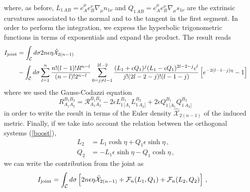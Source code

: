 \documentclass[11pt,letterpaper]{article}
\begin{document}
where, as before, $L_{1\, AB}=e_{A}^{\mu}e_{B}^{\nu}\nabla_{\mu}n_{1\nu}$ and $Q_{1\, AB}=e_{A}^{\mu}e_{B}^{\nu}\nabla_{\mu}s_{1\nu}$ are the extrinsic curvatures associated to the normal and to the tangent in the first segment. In order to perform the integration, we express the hyperbolic trigonometric functions in terms of exponentials and expand the product. The result reads
\begin{equation}
\begin{aligned}
I_{\rm joint}&=\int_{\mathcal{C}}d\sigma 2n\epsilon\eta \hat{\mathcal{X}}_{2(n-1)} \\
&-\int_{\mathcal{C}}d\sigma \sum_{l=1}^{n}\frac{n!(l-1)! R^{n-l}}{(n-l)!2^{n-l}}\sum_{0=j\neq l-1}^{2l-2}\frac{(L_1+\epsilon Q_1)^j(L_1-\epsilon Q_1)^{2l-2-j}\epsilon^{l}}{j!(2l-2-j)!(l-1-j)}\left[e^{-2(l-1-j)\eta}-1\right]
\end{aligned}
\end{equation}
where we used the Gauss-Codazzi equation
\begin{equation}
R^{B_1B_2}_{A_1A_2}=\mathcal{R}^{B_1B_2}_{A_1A_2}-2\epsilon L^{B_1}_{1\, [A_1}L^{B_2}_{1\, A_2]}+2 \epsilon Q^{B_1}_{1\, [A_1}Q^{B_2}_{1\, A_2]}\, 
\end{equation}
in order to write the result in terms of the Euler density $\hat{\mathcal{X}}_{2(n-1)}$ of the induced metric. Finally, if we take into account the relation between the orthogonal systems (\ref{boost}),
\begin{equation}
\begin{aligned}
L_2&=L_1 \cosh\eta +Q_1\epsilon \sinh \eta \, ,\\
Q_2&=- L_1 \epsilon \sinh\eta -Q_1 \cosh \eta \, ,
\end{aligned}
\end{equation}
we can write the contribution from the joint as
\begin{equation}\label{typeI}
\begin{aligned}
I_{\rm joint}&=\int_{\mathcal{C}}d\sigma \left[2n\epsilon \eta \hat{\mathcal{X}}_{2(n-1)}+\mathcal{F}_{n}(L_1,Q_1)+\mathcal{F}_{n}(L_2, Q_2)\right]\, ,
\end{aligned}
\end{equation}
\end{document}

